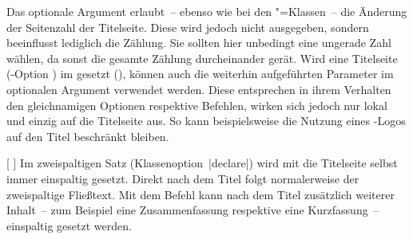 \begin{Declaration*}{}
\begin{Declaration*}{}
\begin{Declaration*}{}
\begin{Declaration}
\begin{Declaration}[v2.02]{%
}
\begin{Declaration}[v2.02]{}{%
}
\begin{Declaration}[v2.03]{}{%
}
\begin{Declaration}[v2.03]{}{%
}
\begin{Declaration}[v2.03]{%
}{}
\begin{Declaration}[v2.03]{%
}{}
\begin{Declaration}[v2.03]{}{%
}
\begin{Declaration}[v2.03]{}{%
}
\begin{Declaration}[v2.03]{}{%
}
Das optionale Argument erlaubt~-- ebenso wie bei den \KOMAScript"=Klassen~-- 
die Änderung der Seitenzahl der Titelseite. Diese wird jedoch nicht ausgegeben, 
sondern beeinflusst lediglich die Zählung. Sie sollten hier unbedingt eine 
ungerade Zahl wählen, da sonst die gesamte Zählung durcheinander gerät. 
Wird eine Titelseite (\KOMAScript-Option ) im \TUDCD 
gesetzt (), können auch die weiterhin aufgeführten 
Parameter im optionalen Argument verwendet werden. Diese entsprechen in ihrem 
Verhalten den gleichnamigen Optionen respektive Befehlen, wirken sich jedoch 
nur lokal und einzig auf die Titelseite aus. So kann beispielsweise die Nutzung 
eines \DDC-Logos auf den Titel beschränkt bleiben.
\end{Declaration}
\end{Declaration}
\end{Declaration}
\end{Declaration}
\end{Declaration}
\end{Declaration}
\end{Declaration}
\end{Declaration}
\end{Declaration}
\end{Declaration}

\begin{Declaration}{%
  [%
  ]%
}
\printdeclarationlist%
%
%
%
Im zweispaltigen Satz (Klassenoption~|declare|) wird mit 
 die Titelseite selbst immer einspaltig gesetzt. Direkt nach 
dem Titel folgt normalerweise der zweispaltige Fließtext. Mit dem Befehl 
 kann nach dem Titel zusätzlich weiterer Inhalt~-- 
zum Beispiel eine Zusammenfassung respektive eine Kurzfassung~-- einspaltig 
gesetzt werden.


\end{Declaration}
\end{Declaration*}
\end{Declaration*}
\end{Declaration*}
